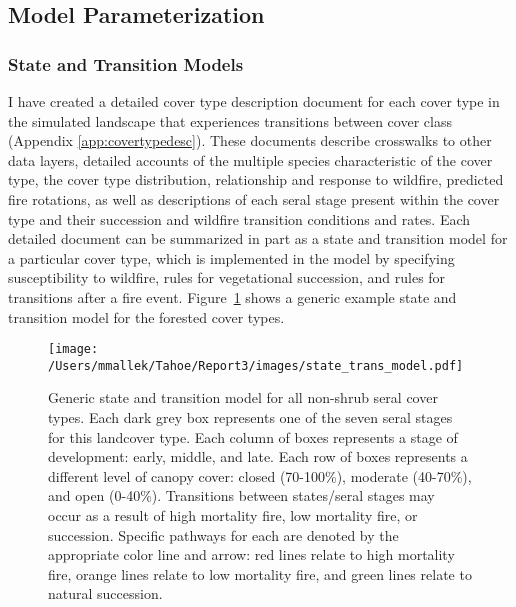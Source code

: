 \subsection{Model Parameterization}
\label{subsec:hrvmodelparam}

\subsubsection{State and Transition Models}
I have created a detailed cover type description document for each cover type in the simulated landscape that experiences transitions between cover class (Appendix \ref{app:covertypedesc}). These documents describe crosswalks to other data layers, detailed accounts of the multiple species characteristic of the cover type, the cover type distribution, relationship and response to wildfire, predicted fire rotations, as well as descriptions of each seral stage present within the cover type and their succession and wildfire transition conditions and rates. Each detailed document can be summarized in part as a state and transition model for a particular cover type, which is implemented in the model by specifying susceptibility to wildfire, rules for vegetational succession, and rules for transitions after a fire event. Figure~\ref{transmodel} shows a generic example state and transition model for the forested cover types.

\begin{figure}[htbp]
\centering
\texttt{[image: /Users/mmallek/Tahoe/Report3/images/state\_trans\_model.pdf]}
\caption{Generic state and transition model for all non-shrub seral cover types. Each dark grey box represents one of the seven seral stages for this landcover type. Each column of boxes represents a stage of development: early, middle, and late. Each row of boxes represents a different level of canopy cover: closed (70-100\%), moderate (40-70\%), and open (0-40\%). Transitions between states/seral stages may occur as a result of high mortality fire, low mortality fire, or succession. Specific pathways for each are denoted by the appropriate color line and arrow: red lines relate to high mortality fire, orange lines relate to low mortality fire, and green lines relate to natural succession.} 
\label{transmodel}
\end{figure}


